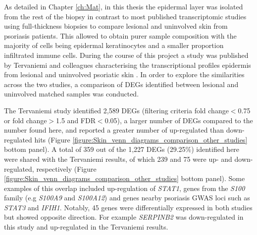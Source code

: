 As detailed in Chapter \ref{ch:Mat}, in this thesis the epidermal layer was isolated from the rest of the biopsy in contrast to most published transcriptomic studies using full-thickness biopsies to compare lesional and uninvolved skin from psoriasis patients. This allowed to obtain purer sample composition with the majority of cells being epidermal keratinocytes and a smaller proportion infiltrated immune cells. During the course of this project a study was published by Tervaniemi and colleagues characterising the transcriptional profiles epidermis from lesional and uninvolved psoriatic skin \parencite{Tervaniemi2016}. %
In order to explore the similarities across the two studies, a comparison of DEGs identified between lesional and uninvolved matched samples was conducted. 


The Tervaniemi study identified 2,589 DEGs (filtering criteria fold change$<$0.75 or fold change$>$1.5 and FDR$<$0.05), a larger number of DEGs compared to the number found here, and reported a greater number of up-regulated than down-regulated hits (Figure \ref{figure:Skin_venn_diagrams_comparison_other_studies} bottom panel). A total of 359 out of the 1,227 DEGs (29.25\%) identified here were shared with the Tervaniemi results, of which 239 and 75 were up- and down-regulated, respectively (Figure \ref{figure:Skin_venn_diagrams_comparison_other_studies} bottom panel). Some examples of this overlap included up-regulation of \textit{STAT1}, genes from the \textit{S100} family (e.g \textit{S100A9} and \textit{S100A12}) and genes nearby psoriasis GWAS loci such as \textit{STAT3} and \textit{IFIH1}. Notably, 45 genes were differentially expressed in both studies but showed opposite direction. For example \textit{SERPINB2} was down-regulated in this study and up-regulated in the Tervaniemi results. 


